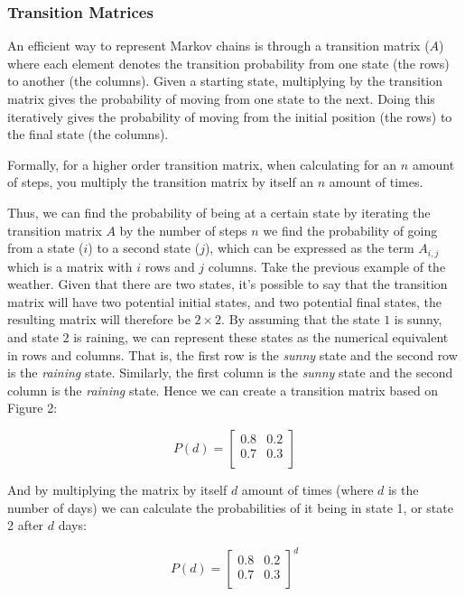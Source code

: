 \documentclass[12pt,a4paper]{article}
\begin{document}
\subsubsection{Transition Matrices}

An efficient way to represent Markov chains is through a transition matrix ($A$) where each element denotes the transition probability from one state (the rows) to another (the columns). Given a starting state, multiplying by the transition matrix gives the probability of moving from one state to the next. Doing this iteratively gives the probability of moving from the initial position (the rows) to the final state (the columns).

Formally, for a higher order transition matrix, when calculating for an $n$ amount of steps, you multiply the transition matrix by itself an $n$ amount of times. 

Thus, we can find the probability of being at a certain state by iterating the transition matrix $A$ by the number of steps $n$ we find the probability of going from a state ($i$) to a second state ($j$), which can be expressed as the term \(A_{i,j}\) which is a matrix with $i$ rows and $j$ columns. Take the previous example of the weather. Given that there are two states, it's possible to say that the transition matrix will have two potential initial states, and two potential final states, the resulting matrix will therefore be $2 \times 2$. By assuming that the state $1$ is sunny, and state $2$ is raining, we can represent these states as the numerical equivalent in rows and columns. That is, the first row is the \textit{sunny} state and the second row is the \textit{raining} state. Similarly, the first column is the \textit{sunny} state and the second column is the \textit{raining} state. Hence we can create a transition matrix based on Figure 2:

\begin{equation*}
P(d) =  \begin{bmatrix}
    0.8 & 0.2\\
    0.7 & 0.3\\
\end{bmatrix}
\end{equation*}

And by multiplying the matrix by itself $d$ amount of times (where $d$ is the number of days) we can calculate the probabilities of it being in state 1, or state 2 after $d$ days:

\begin{equation*}
P(d) =  \begin{bmatrix}
    0.8 & 0.2\\
    0.7 & 0.3\\
\end{bmatrix}^d
\end{equation*}
\end{document}
